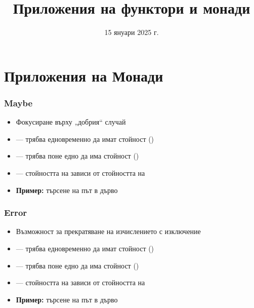\documentclass[alsotrans,beameroptions={aspectratio=169}]{beamerswitch}
\title{Приложения на функтори и монади}
\date{15 януари 2025 г.}
\begin{document}
\begin{frame}
  \titlepage
\end{frame}

\section{Приложения на Монади}

\begin{frame}[fragile]
  \frametitle{Maybe }


  \pause
  \begin{itemize}[<+->]
  \item Фокусиране върху „добрия“ случай
  \item {} --- трябва едновременно да имат стойност ()
  \item {} --- трябва поне едно да има стойност ()
  \item {} --- стойността на  зависи от стойността на 
  \item \textbf{Пример:} търсене на път в дърво
  \end{itemize}
\end{frame}

\begin{frame}[fragile]
  \frametitle{Error }


  \pause
  \begin{itemize}[<+->]
  \item Възможност за прекратяване на изчислението с изключение
  \item {} --- трябва едновременно да имат стойност ()
  \item {} --- трябва поне едно да има стойност ()
  \item {} --- стойността на  зависи от стойността на 
  \item \textbf{Пример:} търсене на път в дърво
  \end{itemize}
\end{frame}
\end{document}
